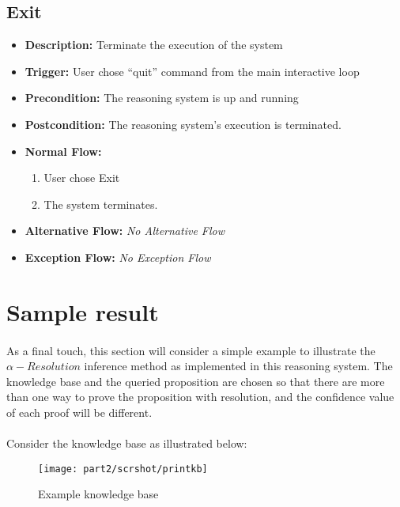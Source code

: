 \documentclass[../gr-final.tex]{subfiles}
\begin{document}
\subsection{Exit}
\begin{itemize}
  \item {\bfseries Description:} Terminate the execution of the
    system
  \item {\bfseries Trigger:} User chose ``quit'' command from the
    main interactive loop
  \item {\bfseries Precondition:} The reasoning system is up and
    running    
  \item {\bfseries Postcondition:} The reasoning system's
    execution is terminated.
  \item {\bfseries Normal Flow:}
    \begin{enumerate}
      \item User chose Exit
      \item The system terminates.
    \end{enumerate}
  \item {\bfseries Alternative Flow:} {\em No Alternative Flow}
  \item {\bfseries Exception Flow:} {\em No Exception Flow}
\end{itemize}
\section{Sample result}
\paragraph{} As a final touch, this section will consider a
simple example to illustrate the $\alpha-Resolution$ inference
method as implemented in this reasoning system. The knowledge
base and the queried proposition are chosen so that there are
more than one way to prove the proposition with resolution, and
the confidence value of each proof will be different. 
\paragraph{} Consider the knowledge base as illustrated below:
\begin{figure}[H]
  \centering
  \texttt{[image: part2/scrshot/printkb]}
  \caption{Example knowledge base}
\end{figure}
\end{document}
